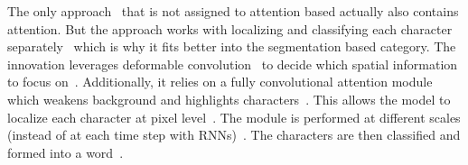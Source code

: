 The only approach~\citep{liao_scene_2018} that is not assigned to attention based actually also
contains attention.
But the approach works with localizing and classifying each character
separately~\citep{liao_scene_2018} which is why it fits better into the segmentation based category.
The innovation leverages deformable convolution~\citep{dai_deformable_2017} to decide
which spatial information to focus on~\citep{liao_scene_2018}.
Additionally, it relies on a fully convolutional attention module which weakens background and
highlights characters~\citep{liao_scene_2018}.
This allows the model to localize each character at pixel level~\citep{liao_scene_2018}.
The module is performed at different scales (instead of at each time step with
\acp{RNN})~\citep{liao_scene_2018,xu_show_2016}.
The characters are then classified and formed into a word~\citep{liao_scene_2018}.

